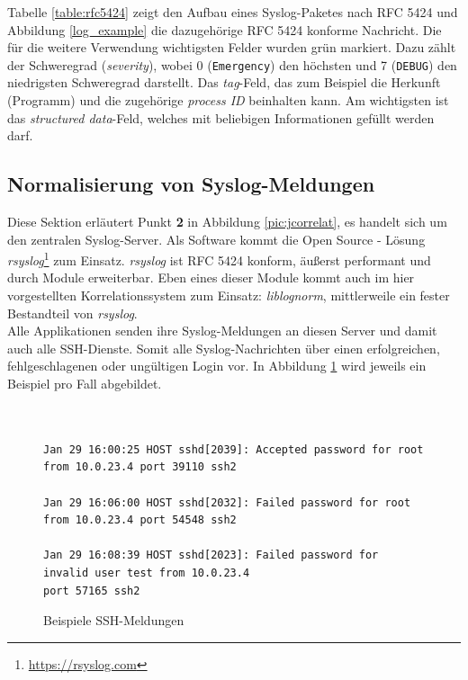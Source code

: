 Tabelle \ref{table:rfc5424} zeigt den Aufbau eines Syslog-Paketes nach RFC 5424 und 
Abbildung \ref{log_example} die dazugehörige RFC 5424 konforme Nachricht. Die für 
die weitere Verwendung wichtigsten Felder wurden grün markiert. Dazu zählt der 
Schweregrad (\textit{severity}), wobei 0 (\texttt{Emergency}) den höchsten und 7 
(\texttt{DEBUG}) 
den niedrigsten Schweregrad darstellt. Das \textit{tag}-Feld, das zum Beispiel die 
Herkunft (Programm) und die zugehörige \textit{process ID} beinhalten kann. Am 
wichtigsten ist das \textit{structured data}-Feld, welches mit beliebigen Informationen 
gefüllt werden darf.

\subsection{Normalisierung von Syslog-Meldungen}\label{syslog-konsolidierung}

Diese Sektion erläutert Punkt \textbf{2} in Abbildung \ref{pic:jcorrelat}, es handelt 
sich um den zentralen Syslog-Server. Als Software kommt die Open Source - Lösung 
\textit{rsyslog}\footnote{\url{https://rsyslog.com}} zum Einsatz. \textit{rsyslog} ist 
RFC 5424 konform, äußerst performant und durch Module erweiterbar. Eben eines dieser 
Module kommt auch im hier vorgestellten Korrelationssystem zum Einsatz: 
\textit{liblognorm}, mittlerweile ein fester Bestandteil von \textit{rsyslog}.\\ 

Alle Applikationen senden ihre Syslog-Meldungen an diesen Server und damit auch alle 
SSH-Dienste. Somit alle Syslog-Nachrichten über einen erfolgreichen, 
fehlgeschlagenen oder ungültigen Login vor. In Abbildung \ref{ssh_example} wird 
jeweils ein Beispiel pro Fall abgebildet.

\begin{figure}[h]
    \caption{Beispiele SSH-Meldungen}
    \label{ssh_example}\vspace{0.2cm}
    \centering
    \begin{shaded*}
    \small{      
        \begin{verbatim}        


Jan 29 16:00:25 HOST sshd[2039]: Accepted password for root from 10.0.23.4 port 39110 ssh2
        
Jan 29 16:06:00 HOST sshd[2032]: Failed password for root from 10.0.23.4 port 54548 ssh2

Jan 29 16:08:39 HOST sshd[2023]: Failed password for invalid user test from 10.0.23.4 
port 57165 ssh2
\end{verbatim}}
\end{shaded*}
\end{figure}

